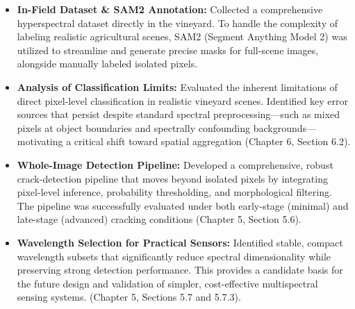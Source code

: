 \begin{itemize}
    \item \textbf{In-Field Dataset \& SAM2 Annotation:} Collected a comprehensive hyperspectral dataset directly in the vineyard. To handle the complexity of labeling realistic agricultural scenes, SAM2 (Segment Anything Model 2) was utilized to streamline and generate precise masks for full-scene images, alongside manually labeled isolated pixels.
    
    \item \textbf{Analysis of Classification Limits:} Evaluated the inherent limitations of direct pixel-level classification in realistic vineyard scenes. Identified key error sources that persist despite standard spectral preprocessing---such as mixed pixels at object boundaries and spectrally confounding backgrounds---motivating a critical shift toward spatial aggregation (Chapter 6, Section 6.2).
    
    \item \textbf{Whole-Image Detection Pipeline:} Developed a comprehensive, robust crack-detection pipeline that moves beyond isolated pixels by integrating pixel-level inference, probability thresholding, and morphological filtering. The pipeline was successfully evaluated under both early-stage (minimal) and late-stage (advanced) cracking conditions (Chapter 5, Section 5.6).
    
    \item \textbf{Wavelength Selection for Practical Sensors:} Identified stable, compact wavelength subsets that significantly reduce spectral dimensionality while preserving strong detection performance. This provides a candidate basis for the future design and validation of simpler, cost-effective multispectral sensing systems. (Chapter 5, Sections 5.7 and 5.7.3).
\end{itemize}